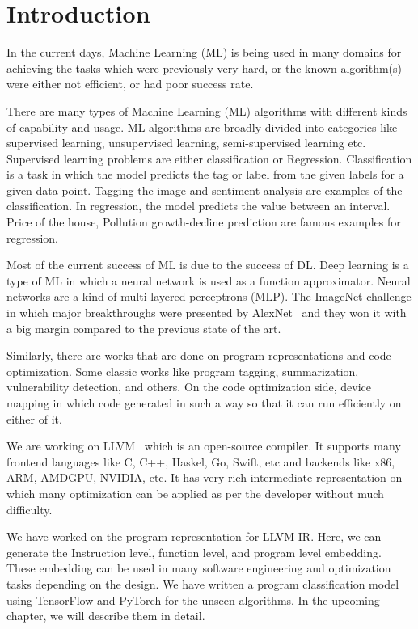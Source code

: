 \chapter{Introduction}
\label{chap:intro}


In the current days, Machine Learning (ML) is being used in many domains for achieving the tasks which were previously very hard, or the known algorithm(s) were either not efficient, or had poor success rate. 


There are many types of Machine Learning (ML) algorithms with different kinds of capability and usage. 
ML algorithms are broadly divided into categories like supervised learning, unsupervised learning, semi-supervised learning etc. Supervised learning problems are either classification or Regression. Classification is a task in which the model predicts the tag or label from the given labels for a given data point. Tagging the image and sentiment analysis are examples of the classification. 
In regression, the model predicts the value between an interval. Price of the house, Pollution growth-decline prediction are famous examples for regression.

	
Most of the current success of ML is due to the success of DL.	
Deep learning is a type of ML in which a neural network is used as a function approximator. Neural networks are a kind of multi-layered perceptrons (MLP).  The ImageNet challenge in which major breakthroughs were presented by AlexNet~\cite{alexnet:NIPS_2012} and they won it with a big margin compared to the previous state of the art.
	
Similarly, there are works that are done on program representations and code optimization. Some classic works like program tagging, summarization, vulnerability detection, and others. On the code optimization side, device mapping in which code generated in such a way so that it can run efficiently on either of it.

We are working on LLVM~\cite{Lattner:2004:llvm} which is an open-source compiler. It supports many frontend languages like C, C++, Haskel, Go, Swift, etc and backends like x86, ARM, AMDGPU, NVIDIA, etc. It has very rich intermediate representation on which many optimization can be applied as per the developer without much difficulty.
	    
	    We have worked on the program representation for LLVM IR. Here, we can generate the Instruction level, function level, and program level embedding. These embedding can be used in many software engineering and optimization tasks depending on the design. We have written a program classification model using TensorFlow\cite{tensorflow2015-whitepaper} and PyTorch\cite{pytorch} for the unseen algorithms. In the upcoming chapter, we will describe them in detail.	
    	
